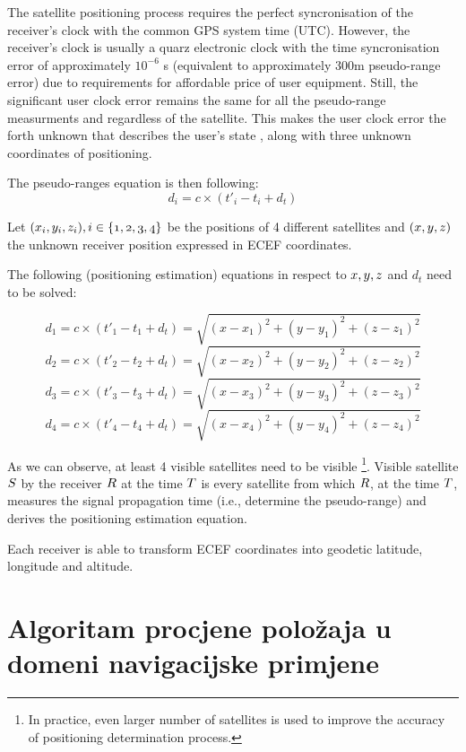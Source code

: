 \documentclass[a4paper,twoside,12pt]{memoir} %
\begin{document}
	The satellite positioning process requires the perfect syncronisation of the receiver's clock with the common GPS system time (UTC). However, the receiver's clock is usually a quarz electronic clock
	with the time syncronisation error of approximately $10^{-6}$ s (equivalent to approximately 300m pseudo-range error) due to requirements for affordable price of user equipment. Still, the 
	significant user clock error remains the same for all the pseudo-range measurments and regardless of the satellite. This makes the user clock error the forth unknown that describes the user's state , along with three unknown coordinates of positioning.
	
	The pseudo-ranges equation is then following:
	$$d_i = c\times(t'_i- t_i+ d_t)$$
	
	\bigbreak
	Let  $\mathnormal{(x_i, y_i, z_i), i \in \{1,2,3,4\}}$ be the positions of 4 different satellites and $(\mathnormal{x}, \mathnormal{y}, \mathnormal{z})$ the unknown receiver position expressed in ECEF coordinates.
	
	The following (positioning estimation) equations in respect to $\mathnormal{x, y, z}$ and $d_t$ need to be solved:
	
	$$ d_1 = c\times(t'_1- t_1+ d_t) = \sqrt{(x-x_1)^{2}+(y-y_1)^{2}+(z-z_1)^{2}} $$
	$$ d_2 = c\times(t'_2- t_2+ d_t) = \sqrt{(x-x_2)^{2}+(y-y_2)^{2}+(z-z_2)^{2}} $$
	$$ d_3 = c\times(t'_3- t_3+ d_t) = \sqrt{(x-x_3)^{2}+(y-y_3)^{2}+(z-z_3)^{2}} $$
	$$ d_4 = c\times(t'_4- t_4+ d_t) = \sqrt{(x-x_4)^{2}+(y-y_4)^{2}+(z-z_4)^{2}} $$
	
	As we can observe, at least 4 visible satellites need to be visible \footnote{In practice, even larger number of satellites is used to improve the accuracy of positioning determination process.}.
	Visible satellite $\mathnormal{S}$ by the receiver $\mathnormal{R}$ at the time $\mathnormal{T}$ is every satellite from which $\mathnormal{R}$, at the time $\mathnormal{T}$, measures the signal propagation time (i.e., determine the pseudo-range) and derives the positioning estimation equation.
	
	Each receiver is able to transform ECEF coordinates into geodetic latitude, longitude and altitude.

\chapter[Algoritam procjene položaja u domeni navigacijske primjene][Procjena položaja]{Algoritam procjene položaja u domeni navigacijske primjene}
\end{document}
